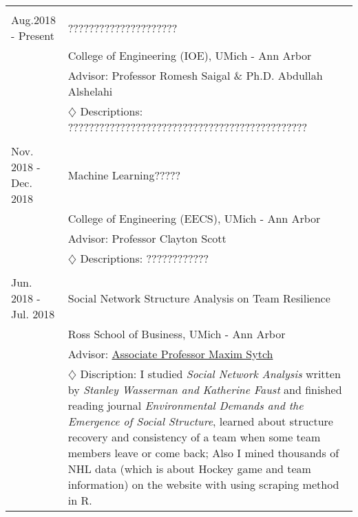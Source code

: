 \documentclass[a4paper,11pt]{article} %
\begin{document}
\begin{longtable}{p{4cm}|p{11cm}}

\multicolumn{2}{c}{}\\
Aug.2018 - Present& ?????????????????????\\
& College of Engineering (IOE), UMich - Ann Arbor\\
& \footnotesize{Advisor: Professor Romesh Saigal \& Ph.D. Abdullah Alshelahi}\\
& \footnotesize{$\diamondsuit$  Descriptions: ??????????????????????????????????????????????}\\

\multicolumn{2}{c}{}\\
Nov. 2018 - Dec. 2018 &  Machine Learning?????\\
& College of Engineering (EECS), UMich - Ann Arbor\\
& \footnotesize{Advisor: Professor Clayton Scott}\\
& \footnotesize{$\diamondsuit$ Descriptions: ????????????}\\

\multicolumn{2}{c}{}\\
Jun. 2018 - Jul. 2018 & Social Network Structure Analysis on Team Resilience\\
& Ross School of Business, UMich - Ann Arbor\\
& \footnotesize{Advisor: \href{https://michiganross.umich.edu/faculty-research/faculty/maxim-sytch}{Associate Professor Maxim Sytch}}\\
& \footnotesize{$\diamondsuit$ Discription: I studied \emph{Social Network Analysis} written by \emph{Stanley Wasserman and Katherine Faust} and finished reading journal \emph{Environmental Demands and the Emergence of Social Structure}, learned about structure recovery and consistency of a team when some team members leave or come back; Also I mined thousands of NHL data (which is about Hockey game and team information) on the website with using scraping method in R.}\\


\end{longtable}
\end{document}
